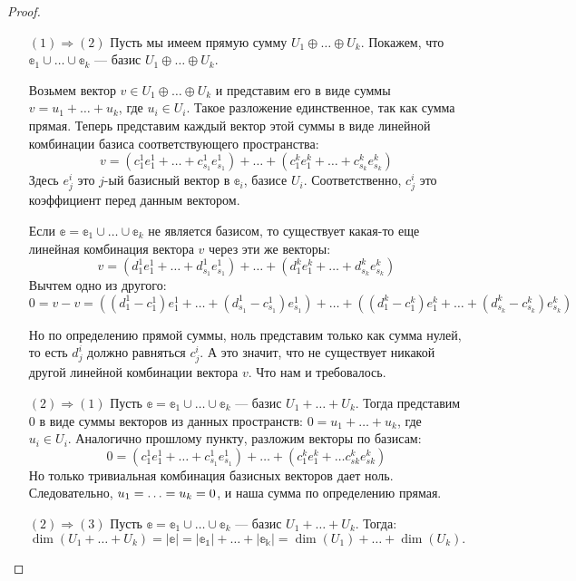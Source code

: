 \begin{proof}\ 
\begin{itemize}
	\item[$(1) \Rightarrow (2)$] Пусть мы имеем прямую сумму $U_1 \oplus \ldots \oplus U_k$. Покажем, что $\mathbb{e}_1 \cup \ldots \cup \mathbb{e}_k$ --- базис $U_1 \oplus \ldots \oplus U_k$.
	
	Возьмем вектор $v \in U_1 \oplus \ldots \oplus U_k$ и представим его в виде суммы $v = u_1 + \ldots + u_k$, где $u_i \in U_i$. Такое разложение единственное, так как сумма прямая. Теперь представим каждый вектор этой суммы в виде линейной комбинации базиса соответствующего пространства: 
	$$
	v  = (c^1_1e^1_1 + \ldots + c^1_{s_1}e^1_{s_1}) + \ldots + (c^k_1e^k_1 + \ldots + c^k_{s_k}e^k_{s_k})
	$$
	Здесь $e_j^i$ это $j$-ый базисный вектор в $\mathbb{e}_i$, базисе $U_i$. Соответственно, $c_j^i$ это коэффициент перед данным вектором. 
	
	Если $\mathbb{e} = \mathbb{e}_1 \cup \ldots \cup \mathbb{e}_k$ не является базисом, то существует какая-то еще линейная комбинация вектора $v$ через эти же векторы:
	$$
		v  = (d^1_1e^1_1 + \ldots + d^1_{s_1}e^1_{s_1}) + \ldots + (d^k_1e^k_1 + \ldots + d^k_{s_k}e^k_{s_k})
	$$
	Вычтем одно из другого:
	$$
	0 = v - v = ((d^1_1 - c^1_1)e^1_1 + \ldots + (d^1_{s_1} - c^1_{s_1})e^1_{s_1}) + \ldots + ((d^k_1 - c^k_1) e^k_1 + \ldots + (d^k_{s_k} - c^k_{s_k})e^k_{s_k})
	$$
	
	Но по определению прямой суммы, ноль представим только как сумма нулей, то есть $d^i_j$ должно равняться $c^i_j$. А это значит, что не существует никакой другой линейной комбинации вектора $v$. Что нам и требовалось.
	
	\item[$(2) \Rightarrow (1)$] Пусть $\mathbb{e} = \mathbb{e}_1 \cup \ldots \cup \mathbb{e}_k$ --- базис $U_1 + \ldots + U_k$. Тогда представим 0 в виде суммы векторов из данных пространств: $0 = u_1 + \ldots + u_k$, где $u_i \in U_i$. Аналогично прошлому пункту, разложим векторы по базисам:
	$$
	0 = (c^1_1e^1_1 + \ldots + c^1_{s_1}e^1_{s_1}) + \ldots + (c^k_1e^k_1 + \ldots c^k_{sk}e^k_{sk})
	$$
	Но только тривиальная комбинация базисных векторов дает ноль. Следовательно, $u_1 \hm= \ldots = u_k = 0$, и наша сумма по определению прямая.
	
	\item[$(2) \Rightarrow (3)$] Пусть $\mathbb{e} = \mathbb{e}_1 \cup \ldots \cup \mathbb{e}_k$ --- базис $U_1 + \ldots + U_k$. Тогда: 
	$$
	\dim(U_1 + \ldots + U_k)  = |\mathbb{e}| = |\mathbb{e_1}|+ \ldots + |\mathbb{e_k}| = \dim(U_1) + \ldots + \dim(U_k).
	$$
	

\end{itemize}
\end{proof}

